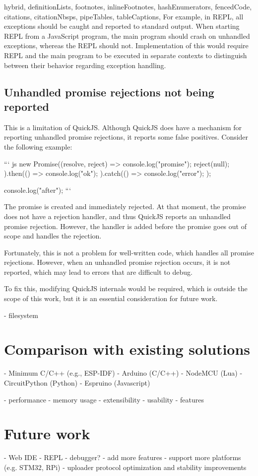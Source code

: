 \documentclass[
  digital,
  oneside,
  nosansbold,
  nocolorbold,
  lof,
  lot
]{fithesis4}
\begin{document}
\begin{markdown*}{%
  hybrid,
  definitionLists,
  footnotes,
  inlineFootnotes,
  hashEnumerators,
  fencedCode,
  citations,
  citationNbsps,
  pipeTables,
  tableCaptions,
}
For example, in REPL, all exceptions should be caught and reported to standard output. When starting REPL from a JavaScript program, the main program should crash on unhandled exceptions, whereas the REPL should not. Implementation of this would require REPL and the main program to be executed in separate contexts to distinguish between their behavior regarding exception handling.


\section{Unhandled promise rejections not being reported}
This is a limitation of QuickJS. Although QuickJS does have a mechanism for reporting unhandled promise rejections, it reports some false positives. Consider the following example:

``` js
new Promise((resolve, reject) => {
    console.log("promise");
    reject(null);
}).then(() => {
    console.log("ok");
}).catch(() => {
    console.log("error");
});

console.log("after");
```

The promise is created and immediately rejected. At that moment, the promise does not have a rejection handler, and thus QuickJS reports an unhandled promise rejection. However, the handler is added before the promise goes out of scope and handles the rejection.

Fortunately, this is not a problem for well-written code, which handles all promise rejections. However, when an unhandled promise rejection occurs, it is not reported, which may lead to errors that are difficult to debug.

To fix this, modifying QuickJS internals would be required, which is outside the scope of this work, but it is an essential consideration for future work.



  - filesystem


\chapter{Comparison with existing solutions}

  - Minimum C/C++ (e.g., ESP-IDF)
  - Arduino (C/C++)
  - NodeMCU (Lua)
  - CircuitPython (Python)
  - Espruino (Javascript)

  - performance
  - memory usage
  - extensibility
  - usability
  - features


\chapter{Future work}

  - Web IDE
  - REPL
  - debugger?
  - add more features
  - support more platforms (e.g. STM32, RPi)
  - uploader protocol optimization and stability improvements

\end{markdown*}
\end{document}
